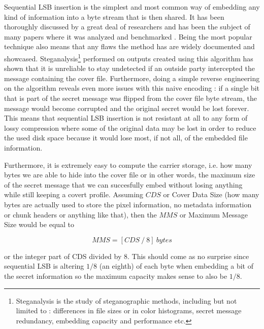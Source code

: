 \begin{multicols*}{2}
Sequential LSB insertion is the simplest and most common way of embedding any kind of information into a byte stream that is then shared. It has been thoroughly discussed by a great deal of researchers and has been the subject of many papers where it was analyzed and benchmarked\cite{seeing-the-unseen}\cite{hide-and-seek} . Being the most popular technique also means that any flaws the method has are widely documented and showcased. Steganalysis\footnote{Steganalysis is the study of steganographic methods, including but not limited to : differences in file sizes or in color histograms, secret message redundancy, embedding capacity and performance etc.} performed on outputs created using this algorithm has shown that it is unreliable to stay undetected if an outside party intercepted the message containing the cover file\cite{attack-on-steganography}. Furthermore, doing a simple reverse engineering on the algorithm reveals even more issues with this naive encoding : if a single bit that is part of the secret message was flipped from the cover file byte stream, the message would become corrupted and the original secret would be lost forever. This means that sequential LSB insertion is not resistant at all to any form of lossy compression where some of the original data may be lost in order to reduce the used disk space because it would lose most, if not all, of the embedded file information. 

Furthermore, it is extremely easy to compute the carrier storage, i.e. how many bytes we are able to hide into the cover file or in other words, the maximum size of the secret message that we can succesfully embed without losing anything while still keeping a covert profile. Assuming $CDS$ or Cover Data Size (how many bytes are actually used to store the pixel information, no metadata information or chunk headers or anything like that), then the $MMS$ or Maximum Message Size would be equal to

\[ MMS = [CDS \ / \ 8] \ bytes \]

or the integer part of CDS divided by 8. This should come as no surprise since sequential LSB is altering $1/8$ (an eighth) of each byte when embedding a bit of the secret information so the maximum capacity makes sense to also be $1/8$.



\end{multicols*}
